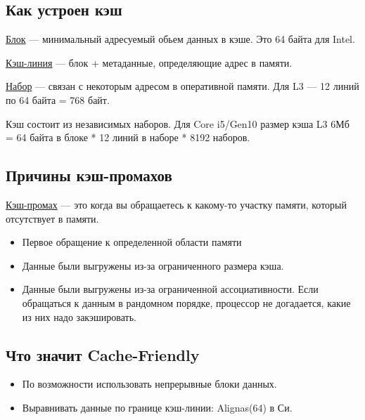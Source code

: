 \subsection{Как устроен кэш}

\begin{Def}
	\underline{Блок} --- минимальный адресуемый обьем данных в кэше. Это 64 байта для Intel.
\end{Def}

\begin{Def}
	\underline{Кэш-линия} --- блок + метаданные, определяющие адрес в памяти.
\end{Def}

\begin{Def}
	\underline{Набор} --- связан с некоторым адресом в оперативной памяти. Для L3 --- 12 
	линий по 64 байта = 768 байт.
\end{Def}

Кэш состоит из независимых наборов. Для Core i5/Gen10 размер кэша L3 6Мб = 64 байта в блоке *
12 линий в наборе * 8192 наборов.


\subsection{Причины кэш-промахов}

\begin{Def}
	\underline{Кэш-промах} --- это когда вы обращаетесь к какому-то участку памяти, который
	отсутствует в памяти.
\end{Def}

\begin{itemize}
	\item Первое обращение к определенной области памяти
	\item Данные были выгружены из-за ограниченного размера кэша.
	\item Данные были выгружены из-за ограниченной ассоциативности. Если обращаться 
	к данным в рандомном порядке, процессор не догадается, какие из них надо закэшировать.
\end{itemize}

\subsection{Что значит Cache-Friendly}

\begin{itemize}
	\item По возможности использовать непрерывные блоки данных.
	\item Выравнивать данные по границе кэш-линии: Alignas(64) в Си.
\end{itemize}

